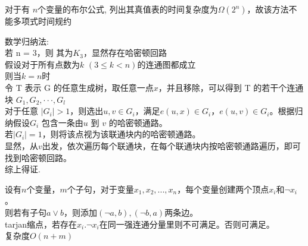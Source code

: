 \documentclass[a4paper, justified]{tufte-handout}
\begin{document}
\begin{solution}
  对于有 $n$个变量的布尔公式, 列出其真值表的时间复杂度为$\Omega(2^n)$，故该方法不能多项式时间规约
\end{solution}

\begin{problem}[TC 34.2-11]
\end{problem}

\begin{solution}
  数学归纳法:\\
  若 n = 3，则 其为$K_3$，显然存在哈密顿回路\\
  假设对于所有点数为$k$ $(3 \leq k < n)$的连通图都成立\\
  则当$k=n$时\\
  令 T 表示 G 的任意生成树，取任意一点$x$，并且移除，可以得到 T 的若干个连通块 $G_1, G_2, · · · , G_l$\\
  对于任意 $|G_i|>1$，则选出$u, v\in G_i$，满足$e(u,x)\in G_i$，$e(u,v)\in G_i$。根据归纳假设$G_i$ 包含一条由$u$ 到 $v$ 的哈密顿通路。\\
  若$|G_i|=1$，则将该点视为该联通块内的哈密顿通路。\\
  显然，从$v$出发，依次遍历每个联通块，在每个联通块内按哈密顿通路遍历，即可找到哈密顿回路。\\
  综上得证.
\end{solution}

\begin{problem}[TC 34.4-7]
\end{problem}

\begin{solution}
  设有$n$个变量，$m$个子句，对于变量$x_1,x_2,...,x_n$，每个变量创建两个顶点$x_i$和$\neg x_i$。\\
  则若有子句$a\lor b$，则添加$ (\neg a, b),(\neg b, a)$两条边。\\
  tarjan缩点，若存在$x_i.\neg x_i$在同一强连通分量里则不可满足。否则可满足。\\
  复杂度$O(n+m)$
\end{solution}

\begin{problem}[TC 34.5-6]
\end{problem}
\end{document}
